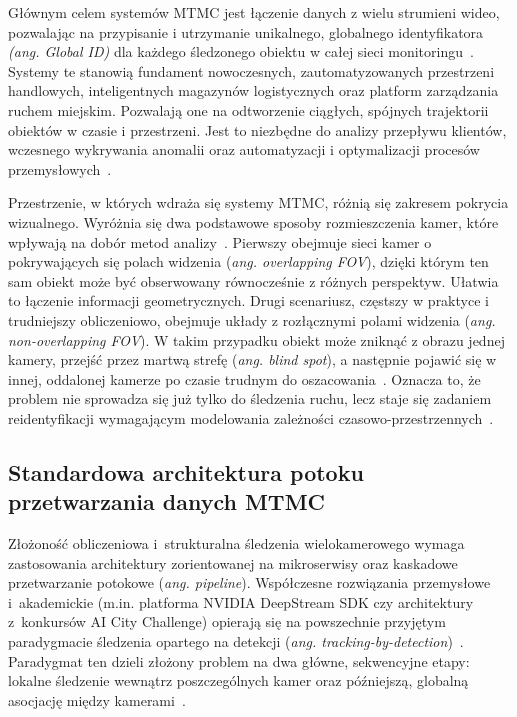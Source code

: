 Głównym celem systemów MTMC jest łączenie danych z wielu strumieni wideo, pozwalając na przypisanie
i utrzymanie unikalnego, globalnego identyfikatora \textit{(ang. Global ID)} dla każdego śledzonego
obiektu w całej sieci monitoringu~\cite{ristani2016, nvidia_mtmc}. Systemy te stanowią fundament
nowoczesnych, zautomatyzowanych przestrzeni handlowych, inteligentnych magazynów logistycznych oraz
platform zarządzania ruchem miejskim. Pozwalają one na odtworzenie ciągłych, spójnych trajektorii
obiektów w czasie i przestrzeni. Jest to niezbędne do analizy przepływu klientów, wczesnego
wykrywania anomalii oraz automatyzacji i optymalizacji procesów przemysłowych~\cite{nvidia_mtmc}.

Przestrzenie, w których wdraża się systemy MTMC, różnią się zakresem pokrycia wizualnego. Wyróżnia
się dwa podstawowe sposoby rozmieszczenia kamer, które wpływają na dobór metod
analizy~\cite{woo2024}. Pierwszy obejmuje sieci kamer o pokrywających się polach widzenia
(\textit{ang. overlapping FOV}), dzięki którym ten sam obiekt może być obserwowany równocześnie z
różnych perspektyw. Ułatwia to łączenie informacji geometrycznych. Drugi scenariusz, częstszy w
praktyce i trudniejszy obliczeniowo, obejmuje układy z rozłącznymi polami widzenia (\textit{ang.
  non-overlapping FOV}). W takim przypadku obiekt może zniknąć z obrazu jednej kamery, przejść przez
martwą strefę (\textit{ang. blind spot}), a następnie pojawić się w innej, oddalonej kamerze po
czasie trudnym do oszacowania~\cite{ristani2016}. Oznacza to, że problem nie sprowadza się już
tylko do śledzenia ruchu, lecz staje się zadaniem reidentyfikacji wymagającym modelowania
zależności czasowo-przestrzennych~\cite{ristani2016}.

\subsection{Standardowa architektura potoku przetwarzania danych MTMC}

Złożoność obliczeniowa i~strukturalna śledzenia wielokamerowego wymaga zastosowania architektury
zorientowanej na mikroserwisy oraz kaskadowe przetwarzanie potokowe (\textit{ang. pipeline}).
Współczesne rozwiązania przemysłowe i~akademickie (m.in. platforma NVIDIA DeepStream SDK czy
architektury z~konkursów AI City Challenge) opierają się na powszechnie przyjętym paradygmacie
śledzenia opartego na detekcji (\textit{ang. tracking-by-detection})~\cite{nvidia_mtmc, riu2024}.
Paradygmat ten dzieli złożony problem na dwa główne, sekwencyjne etapy: lokalne śledzenie wewnątrz
poszczególnych kamer oraz późniejszą, globalną asocjację między kamerami~\cite{woo2024}.

